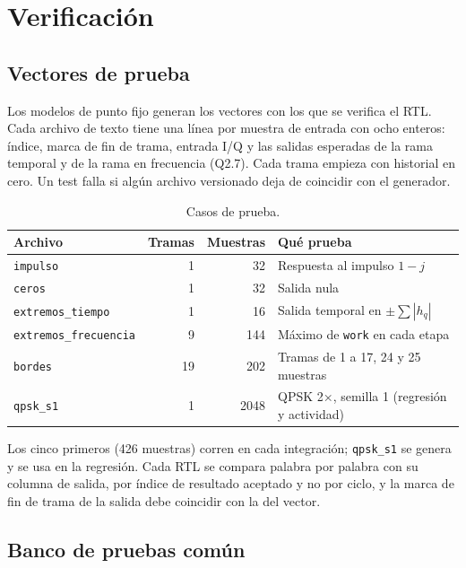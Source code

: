 \section{Verificación}\label{sec:verificacion}

\subsection{Vectores de prueba}

Los modelos de punto fijo generan los vectores con los que se verifica el RTL. Cada archivo de texto tiene una línea por muestra de entrada con ocho enteros: índice, marca de fin de trama, entrada I/Q y las salidas esperadas de la rama temporal y de la rama en frecuencia (Q2.7). Cada trama empieza con historial en cero. Un test falla si algún archivo versionado deja de coincidir con el generador.

\begin{table}[h]
  \centering
  \caption{Casos de prueba.}\label{tab:vectores}
  \begin{tabular}{lrrl}
    \toprule
    Archivo & Tramas & Muestras & Qué prueba \\
    \midrule
    \texttt{impulso} & 1 & 32 & Respuesta al impulso $1-j$ \\
    \texttt{ceros} & 1 & 32 & Salida nula \\
    \texttt{extremos\_tiempo} & 1 & 16 & Salida temporal en $\pm\sum|h_q|$ \\
    \texttt{extremos\_frecuencia} & 9 & 144 & Máximo de \texttt{work} en cada etapa \\
    \texttt{bordes} & 19 & 202 & Tramas de 1 a 17, 24 y 25 muestras \\
    \texttt{qpsk\_s1} & 1 & 2048 & QPSK 2×, semilla 1 (regresión y actividad) \\
    \bottomrule
  \end{tabular}
\end{table}

Los cinco primeros (426 muestras) corren en cada integración; \texttt{qpsk\_s1} se genera y se usa en la regresión. Cada RTL se compara palabra por palabra con su columna de salida, por índice de resultado aceptado y no por ciclo, y la marca de fin de trama de la salida debe coincidir con la del vector.

\subsection{Banco de pruebas común}

